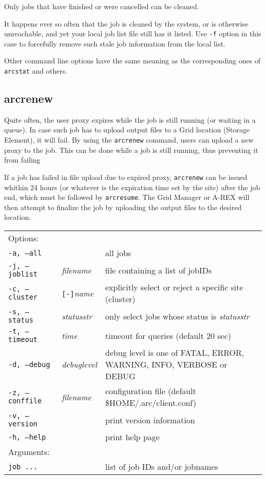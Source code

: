 Only jobs that have finished or were cancelled can be cleaned.

It happens ever so often that the job is cleaned by the system, or is otherwise unreachable, and yet your
local job list file still has it listed. Use \verb#-f# option in this case to forcefully remove such stale job
information from the local list.

Other command line options have the same meaning as the corresponding ones of \verb#arcstat# and others.


\subsection{arcrenew}
\label{sec:arcrenew}

Quite often, the user proxy expires while the job is still running (or
waiting in a queue). In case such job has to upload output files to a
Grid location (Storage Element), it will fail. By using the \texttt{arcrenew}
 command, users can upload
a new proxy to the job. This can be done while a job is still running,
thus preventing it from failing

If a job has failed in file upload due to expired proxy, \texttt{arcrenew}
can be issued whithin 24 hours (or whatever is
the expiration time set by the site) after the job
end, which must be followed by \texttt{arcresume}. The Grid
Manager or A-REX will then attempt to finalize
the job by uploading the output files to the desired location.

\hspace*{0.5cm}
\begin{shaded}
\end{shaded}
\begin{longtable}{llp{8cm}}
   Options:&&\\
   \texttt{-a, --all}& & all jobs\\
   \texttt{-j, --joblist}& \textit{filename} & file containing a list of jobIDs\\
   \texttt{-c, --cluster}&\verb#[-]#\textit{name}&explicitly select or reject a specific site (cluster)\\
   \texttt{-s, --status}& \textit{statusstr} &only select jobs whose status is \textit{statusstr}\\
   \texttt{-t, --timeout}& \textit{time} & timeout for queries (default 20 sec)\\
   \texttt{-d, --debug}& \textit{debuglevel}&debug level is one of  FATAL, ERROR, WARNING, INFO, VERBOSE or DEBUG\\
   \texttt{-z, --conffile}&\textit{filename}& configuration file (default {\$}HOME/.arc/client.conf)\\
   \texttt{-v, --version}& & print version information\\
   \texttt{-h, --help}& & print help page\\
   Arguments:&&\\
   \texttt{job ...} && list of job IDs and/or jobnames\\
\end{longtable}

